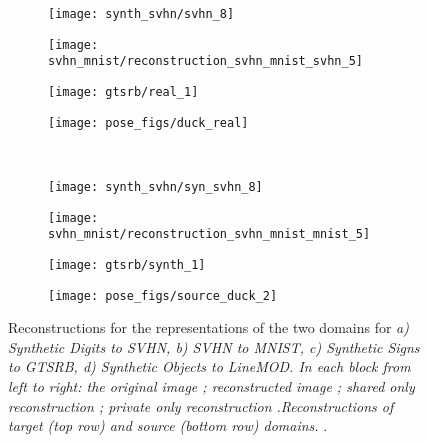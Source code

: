 \documentclass{article}
\begin{document}
\begin{figure}[ht]
    \begin{subfigure}[b]{\subfigscale\linewidth}
        \centering
        \texttt{[image: synth\_svhn/svhn\_8]}
    \end{subfigure}
    \begin{subfigure}[b]{\subfigscale\linewidth}
        \centering
        \texttt{[image: svhn\_mnist/reconstruction\_svhn\_mnist\_svhn\_5]}
    \end{subfigure}
    \begin{subfigure}[b]{\subfigscale\linewidth}
        \centering
        \texttt{[image: gtsrb/real\_1]}
    \end{subfigure}
    \begin{subfigure}[b]{\subfigscale\linewidth}
        \centering
        \texttt{[image: pose\_figs/duck\_real]}
    \end{subfigure} \\
    \begin{subfigure}[b]{\subfigscale\linewidth}
        \centering
        \texttt{[image: synth\_svhn/syn\_svhn\_8]}
        \caption{}
    \end{subfigure}
    \begin{subfigure}[b]{\subfigscale\linewidth}
        \centering
        \texttt{[image: svhn\_mnist/reconstruction\_svhn\_mnist\_mnist\_5]}
        \caption{}
    \end{subfigure}
    \begin{subfigure}[b]{\subfigscale\linewidth}
        \centering
        \texttt{[image: gtsrb/synth\_1]}
        \caption{}
    \end{subfigure}
    \begin{subfigure}[b]{\subfigscale\linewidth}
        \centering
        \texttt{[image: pose\_figs/source\_duck\_2]}
        \caption{}
    \end{subfigure}
    \caption{
    Reconstructions for the representations of the two domains for \textit{a) Synthetic Digits to SVHN, \textit{b)} SVHN to MNIST, \textit{c)} Synthetic Signs to GTSRB, \textit{d)} Synthetic Objects to LineMOD. In each block from left to right: the original image ; reconstructed image ; shared only reconstruction  ;  private only reconstruction  .Reconstructions of target \textit{(top row)} and source \textit{(bottom row)} domains. }.
    }
    \label{fig:sdads}
\end{figure}
\end{document}
